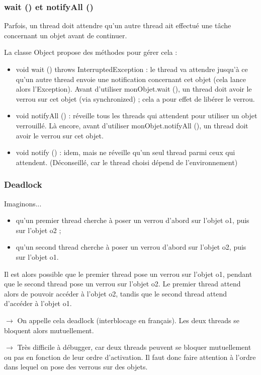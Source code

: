 \documentclass{beamer}
\begin{document}
\begin{frame}
  \frametitle{wait () et notifyAll ()}
  Parfois, un thread doit attendre qu'un autre thread ait effectué une
  tâche concernant un objet avant de continuer.

  La classe Object propose des méthodes pour gérer cela :
  \begin{itemize}
  \item void wait () throws InterruptedException : le
    thread va attendre jusqu'à ce qu'un autre thread envoie une
    notification concernant cet objet (cela lance alors
    l'Exception). Avant d'utiliser monObjet.wait (), un thread doit
    avoir le verrou sur cet objet (via synchronized) ; cela a pour
    effet de libérer le verrou.
  \item void notifyAll () : réveille tous les threads qui attendent
    pour utiliser un objet verrouillé. Là encore, avant d'utiliser
    monObjet.notifyAll (), un thread doit avoir le verrou sur cet objet.
  \item void notify () : idem, mais ne réveille qu'un seul thread
    parmi ceux qui attendent. (Déconseillé, car le thread choisi
    dépend de l'environnement)
  \end{itemize}
\end{frame}

\begin{frame}
  \frametitle{Deadlock}
  Imaginons...
  \begin{itemize}
  \item qu'un premier thread cherche à poser un verrou d'abord sur l'objet
    o1, puis sur l'objet o2 ;
  \item qu'un second thread cherche à poser un verrou d'abord sur
    l'objet o2, puis sur l'objet o1.
  \end{itemize}
  Il est alors possible que le premier thread pose un verrou sur
  l'objet o1, pendant que le second thread pose un verrou sur l'objet
  o2. Le premier thread attend alors de pouvoir accéder à l'objet o2,
  tandis que le second thread attend d'accéder à l'objet o1.

  $\rightarrow$ On appelle cela deadlock (interblocage en
  français). Les deux threads se bloquent alors mutuellement. 

  $\rightarrow$ Très difficile à débugger, car deux threads peuvent se
  bloquer mutuellement ou pas en fonction de leur ordre
  d'activation. Il faut donc faire attention à l'ordre dans lequel on
  pose des verrous sur des objets.
\end{frame}
\end{document}
